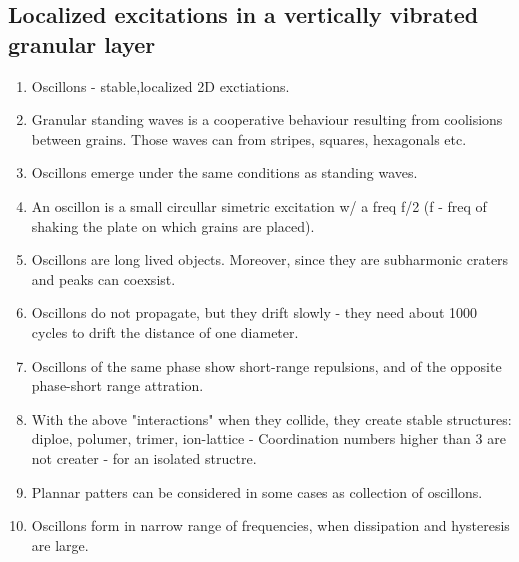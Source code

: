 \documentclass[10pt,a4paper]{article}
\begin{document}
\subsection{Localized excitations in a vertically vibrated granular layer \cite{swinney:96}}
\begin{enumerate}
 \item Oscillons - stable,localized 2D exctiations.
 \item Granular standing waves is a cooperative behaviour resulting from coolisions between grains. 
 Those waves can from stripes, squares, hexagonals etc. 
 \item Oscillons emerge under the same conditions as standing waves.
 \item An oscillon is a small circullar simetric excitation w/ a freq f/2 (f - freq of shaking the plate on which grains are placed).
 \item Oscillons are long lived objects. Moreover, since they are subharmonic craters and peaks can coexsist. 
 \item Oscillons do not propagate, but they drift slowly - they need about 1000 cycles to drift the distance of one diameter. 
 \item Oscillons of the same phase show short-range repulsions, and of the opposite phase-short range attration. 
 \item With the above "interactions" when they collide, they create stable structures: diploe, polumer, trimer, ion-lattice - Coordination numbers higher than 3 are not creater - for an isolated structre.
 \item Plannar patters can be considered in some cases as collection of oscillons. 
 \item Oscillons form in narrow range of frequencies, when dissipation and hysteresis are large. 
\end{enumerate}


\thispagestyle{empty} %




\clearpage
\end{document}

